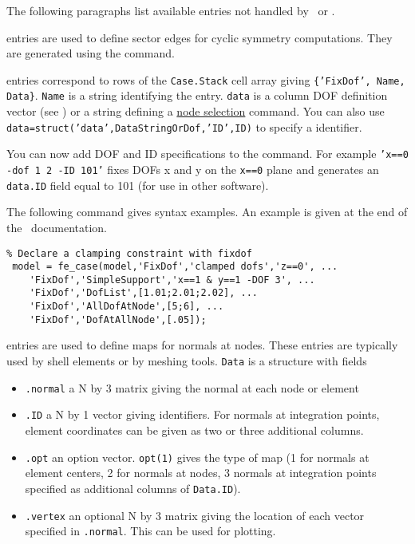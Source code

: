 
The following paragraphs list available entries not handled by \feload\ or \upcom.


\rz{} entries are used to define sector edges for cyclic symmetry computations. They are generated using the  command.


 entries correspond to rows of the {\tt Case.Stack} cell array giving {\tt \{'FixDof', Name, Data\}}. {\tt Name} is a string identifying the entry. {\tt data} is a column DOF definition vector (see ) or a string defining a \hyperlink{findnode}{node selection} command. You can also use \\{\tt data=struct('data',DataStringOrDof,'ID',ID)} to specify a identifier.

You can now add DOF and ID specifications to the  command. For example {\tt 'x==0 -dof 1 2 -ID 101'} fixes DOFs x and y on the {\tt x==0} plane and generates an {\tt data.ID} field equal to 101 (for use in other software).

The following command gives syntax examples. An example is given at the end of the \fecase\ documentation.

\begin{verbatim}
% Declare a clamping constraint with fixdof
 model = fe_case(model,'FixDof','clamped dofs','z==0', ...
    'FixDof','SimpleSupport','x==1 & y==1 -DOF 3', ...
    'FixDof','DofList',[1.01;2.01;2.02], ...
    'FixDof','AllDofAtNode',[5;6], ...
    'FixDof','DofAtAllNode',[.05]);
\end{verbatim}



 entries are used to define maps for normals at nodes. These entries are typically used by shell elements or by meshing tools. {\tt Data} is a structure with fields

\begin{itemize}
 \item {\tt .normal} a N by 3 matrix giving the normal at each node or element
 \item {\tt .ID} a N by 1 vector giving identifiers. For normals at integration points, element coordinates can be given as two or three additional columns.
 \item {\tt .opt} an option vector. {\tt opt(1)} gives the type of map (1 for normals at element centers, 2 for normals at nodes, 3 normals at integration points specified as additional columns of {\tt Data.ID}).
 \item {\tt .vertex} an optional N by 3 matrix giving the location of each vector specified in {\tt .normal}. This can be used for plotting. 
\end{itemize}

